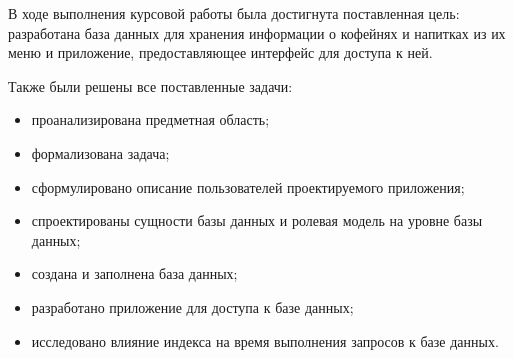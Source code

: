 
В ходе выполнения курсовой работы была достигнута поставленная цель: разработана база данных для хранения информации о кофейнях и напитках из их меню и приложение, предоставляющее интерфейс для доступа к ней.

Также были решены все поставленные задачи:
\begin{itemize}
	\item проанализирована предметная область;
	\item формализована задача;
	\item сформулировано описание пользователей проектируемого приложения;
	\item спроектированы сущности базы данных и ролевая модель на уровне базы данных;
	\item создана и заполнена база данных;
	\item разработано приложение для доступа к базе данных;
	\item исследовано влияние индекса на время выполнения запросов к базе данных.
\end{itemize}